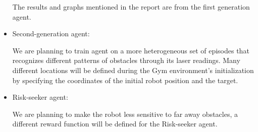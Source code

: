 \documentclass[conference]{IEEEtran}
\begin{document}
\begin{itemize}


    The results and graphs mentioned in the report are from the first generation agent. 
    

    \item Second-generation agent: \par
    We are planning to train agent on a more heterogeneous set of episodes that recognizes different patterns of obstacles through its laser readings. Many different locations will be defined during the Gym environment's initialization by specifying the coordinates of the initial robot position and the target.

    \item Risk-seeker agent: \par
    We are planning to make the robot less sensitive to far away obstacles, a different reward function will be defined for the Risk-seeker agent.





\end{itemize}
\end{document}
